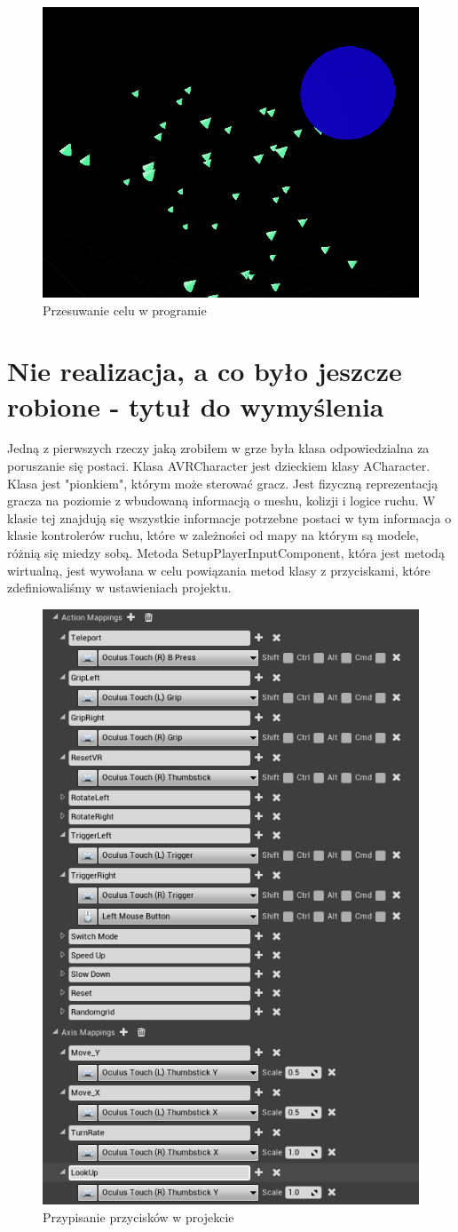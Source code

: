 \documentclass[a4paper,12pt,reqno]{article}
\begin{document}
\begin{figure}[H]%
\centering
\includegraphics[width=0.7\columnwidth]{graphics/boids/BoidsInUE.png}
\caption{Przesuwanie celu w programie
\label{BPExample}}%
%
\qquad
\end{figure}  

\newpage
\section{Nie realizacja, a co było jeszcze robione - tytuł do wymyślenia}

Jedną z pierwszych rzeczy jaką zrobiłem w grze była klasa odpowiedzialna za poruszanie się postaci. Klasa AVRCharacter jest dzieckiem klasy ACharacter. Klasa jest "pionkiem", którym może sterować gracz. Jest fizyczną reprezentacją gracza na poziomie z wbudowaną informacją o meshu, kolizji i logice ruchu. W klasie tej znajdują się wszystkie informacje potrzebne postaci w tym informacja o klasie kontrolerów ruchu, które w zależności od mapy na którym są modele, różnią się miedzy sobą. Metoda SetupPlayerInputComponent, która jest metodą wirtualną, jest wywołana w celu powiązania metod klasy z przyciskami, które zdefiniowaliśmy w ustawieniach projektu. 




\begin{figure}[H]%
\centering
\includegraphics[width=0.4\linewidth]{graphics/05/InputMappingUE4.png}
\caption{Przypisanie przycisków w projekcie }	
\label{ref:InputMappingUE4}
\end{figure}%
\end{document}
